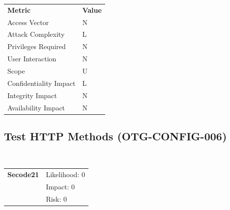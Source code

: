 \documentclass[headsepline,footsepline,footinclude=false,oneside,fontsize=11pt,paper=a4,listof=totoc,bibliography=totoc]{scrbook} %
\begin{document}
\begin{center}
	\begin{tabular}{ll}
		\rowcolor[HTML]{34CDF9}
		{\color[HTML]{ECF4FF} \textbf{Metric}}        & {\color[HTML]{ECF4FF} \textbf{Value}} \\
		\rowcolor[HTML]{BBDAFF}
		{\color[HTML]{333333} Access Vector}          & {\color[HTML]{333333} } N              \\
		\rowcolor[HTML]{ECF4FF}
		{\color[HTML]{333333} Attack Complexity}      & {\color[HTML]{333333} } L              \\
		\rowcolor[HTML]{BBDAFF}
		{\color[HTML]{333333} Privileges Required}    & {\color[HTML]{333333} } N              \\
		\rowcolor[HTML]{ECF4FF}
		{\color[HTML]{333333} User Interaction}       & {\color[HTML]{333333} } N              \\
		\rowcolor[HTML]{BBDAFF}
		{\color[HTML]{333333} Scope}                  & {\color[HTML]{333333} } U              \\
		\rowcolor[HTML]{ECF4FF}
		{\color[HTML]{333333} Confidentiality Impact} & {\color[HTML]{333333} } L              \\
		\rowcolor[HTML]{BBDAFF}
		{\color[HTML]{333333} Integrity Impact}       & {\color[HTML]{333333} } N              \\
		\rowcolor[HTML]{ECF4FF}
		{\color[HTML]{333333} Availability Impact}    & {\color[HTML]{333333} } N
	\end{tabular}
\end{center}
\pagebreak

\subsection{Test HTTP Methods (OTG-CONFIG-006)}\


\begin{tabular}{cR{12cm}}
	\textbf{Secode21} & Likelihood: 0\\& Impact: 0\\& Risk: 0
\end{tabular}
\end{document}
